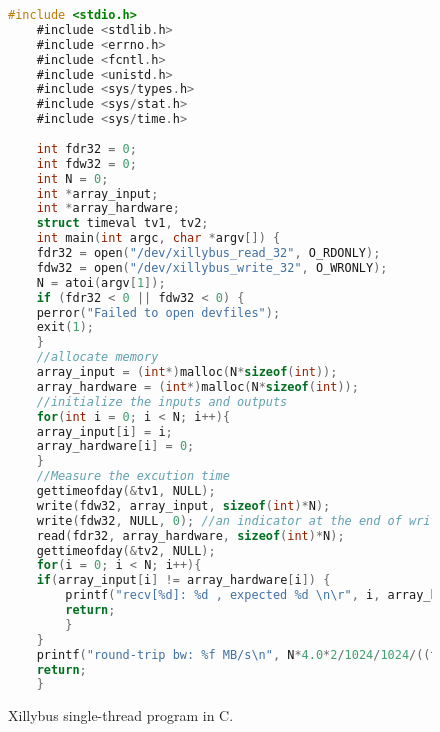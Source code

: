 \begin{figure}[!h]
	\centering	
	\begin{lstlisting}[columns=fullflexible, language=C]
	#include <stdio.h>
	#include <stdlib.h>
	#include <errno.h>
	#include <fcntl.h>
	#include <unistd.h>
	#include <sys/types.h>
	#include <sys/stat.h>
	#include <sys/time.h>
		
	int fdr32 = 0;
	int fdw32 = 0;
	int N = 0;
	int *array_input;
	int *array_hardware;
	struct timeval tv1, tv2; 	
	int main(int argc, char *argv[]) {
	fdr32 = open("/dev/xillybus_read_32", O_RDONLY);
	fdw32 = open("/dev/xillybus_write_32", O_WRONLY);
	N = atoi(argv[1]);
	if (fdr32 < 0 || fdw32 < 0) {
	perror("Failed to open devfiles");
	exit(1);
	}
	//allocate memory
	array_input = (int*)malloc(N*sizeof(int));
	array_hardware = (int*)malloc(N*sizeof(int));
	//initialize the inputs and outputs
	for(int i = 0; i < N; i++){
	array_input[i] = i;
	array_hardware[i] = 0;
	}
	//Measure the excution time
	gettimeofday(&tv1, NULL);
	write(fdw32, array_input, sizeof(int)*N);
	write(fdw32, NULL, 0); //an indicator at the end of writing data
	read(fdr32, array_hardware, sizeof(int)*N);
	gettimeofday(&tv2, NULL); 
	for(i = 0; i < N; i++){
	if(array_input[i] != array_hardware[i]) {
		printf("recv[%d]: %d , expected %d \n\r", i, array_hardware[i], array_input[i]);
		return;
		}
	}
	printf("round-trip bw: %f MB/s\n", N*4.0*2/1024/1024/((tv2.tv_sec-tv1.tv_sec)+(tv2.tv_usec-tv1.tv_usec)/1000000);
	return;
	}
	\end{lstlisting}
	\caption{Xillybus single-thread program in C.}
	\label{xillybus_host_program}
\end{figure}